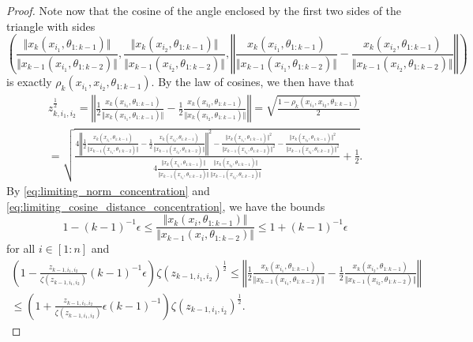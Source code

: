 \documentclass[twoside,11pt]{article}
\begin{document}
\begin{proof}
Note now that the cosine of the angle enclosed by the first two sides of the triangle with sides 
\[
\left( 
\frac{\Vert x_k(x_{i_1}, \theta_{1 : k-1}) \Vert}{\Vert x_{k-1}(x_{i_1}, \theta_{1 : k-2}) \Vert}, 
\frac{\Vert x_k(x_{i_2}, \theta_{1 : k-1}) \Vert}{\Vert x_{k-1}(x_{i_2}, \theta_{1 : k-2}) \Vert}, 
\left\Vert \frac{x_k(x_{i_1}, \theta_{1 : k-1})}{\Vert x_{k-1}(x_{i_1}, \theta_{1 : k-2}) \Vert} - \frac{x_k(x_{i_2}, \theta_{1 : k-1})}{\Vert x_{k-1}(x_{i_2}, \theta_{1 : k-2}) \Vert} \right\Vert
\right)
\]
is exactly $\rho_k(x_{i_1},x_{i_2},\theta_{1:k-1})$. By the law of cosines, we then have that
\begin{multline*}
z_{k,i_1,i_2}^{\frac{1}{2}}
= \left\Vert \frac{1}{2} \frac{x_k(x_{i_1}, \theta_{1 : k-1})}{\Vert x_k(x_{i_1}, \theta_{1 : k-1}) \Vert} - \frac{1}{2} \frac{x_k(x_{i_2}, \theta_{1 : k-1})}{\Vert x_k(x_{i_2}, \theta_{1 : k-1}) \Vert} \right\Vert
= \sqrt{ \frac{1 - \rho_k(x_{i_1},x_{i_2},\theta_{1:k-1})}{2} } \\
= \sqrt{ \frac{ 4 \left\Vert \frac{1}{2} \frac{x_k(x_{i_1}, \theta_{1 : k-1})}{\Vert x_{k-1}(x_{i_1}, \theta_{1 : k-2}) \Vert} - \frac{1}{2} \frac{x_k(x_{i_2}, \theta_{1 : k-1})}{\Vert x_{k-1}(x_{i_2}, \theta_{1 : k-2}) \Vert} \right\Vert^2 - \frac{\Vert x_k(x_{i_1}, \theta_{1 : k-1}) \Vert^2}{\Vert x_{k-1}(x_{i_1}, \theta_{1 : k-2}) \Vert^2} - \frac{\Vert x_k(x_{i_2}, \theta_{1 : k-1}) \Vert^2}{\Vert x_{k-1}(x_{i_2}, \theta_{1 : k-2}) \Vert^2} }{ 4 \frac{\Vert x_k(x_{i_1}, \theta_{1 : k-1}) \Vert}{\Vert x_{k-1}(x_{i_1}, \theta_{1 : k-2}) \Vert} \frac{\Vert x_k(x_{i_2}, \theta_{1 : k-1}) \Vert}{\Vert x_{k-1}(x_{i_2}, \theta_{1 : k-2}) \Vert} } + \frac{1}{2} }.
\end{multline*}
By \eqref{eq:limiting_norm_concentration} and \eqref{eq:limiting_cosine_distance_concentration}, we have the bounds
\[
1-(k-1)^{-1}\epsilon
\leq \frac{\Vert x_k(x_i, \theta_{1 : k-1}) \Vert}{\Vert x_{k-1}(x_i, \theta_{1 : k-2}) \Vert}
\leq 1+(k-1)^{-1}\epsilon
\]
for all $i \in [1:n]$ and
\begin{multline*}
\left( 1 - \frac{z_{k-1,i_1,i_2}}{\zeta(z_{k-1,i_1,i_2})} (k-1)^{-1} \epsilon \right) \zeta(z_{k-1,i_1,i_2})^{\frac{1}{2}}
\leq \left\Vert \frac{1}{2} \frac{x_k(x_{i_1}, \theta_{1 : k-1})}{\Vert x_{k-1}(x_{i_1}, \theta_{1 : k-2}) \Vert} - \frac{1}{2} \frac{x_k(x_{i_2}, \theta_{1 : k-1})}{\Vert x_{k-1}(x_{i_2}, \theta_{1 : k-2}) \Vert} \right\Vert \\
\leq \left( 1 + \frac{z_{k-1,i_1,i_2}}{\zeta(z_{k-1,i_1,i_2})} \epsilon (k-1)^{-1} \right) \zeta(z_{k-1,i_1,i_2})^{\frac{1}{2}}.

\end{multline*}
\end{proof}
\end{document}
